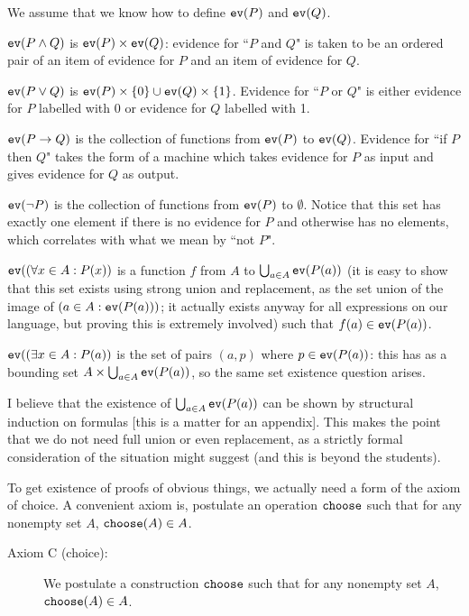 \documentclass[12pt]{article}
\begin{document}
\begin{description}
We assume that we know how to define ${\tt ev}(P)$ and ${\tt ev}(Q)$.

${\tt ev}(P \wedge Q)$ is ${\tt ev}(P) \times {\tt ev}(Q)$:  evidence for ``$P$ and $Q$" is taken to be an ordered pair of an item of evidence for $P$ and an item of evidence for $Q$.

${\tt ev}(P \vee Q)$ is ${\tt ev}(P) \times \{0\} \cup {\tt ev}(Q) \times \{1\}$.  Evidence for ``$P$ or $Q$"
is either evidence for $P$ labelled with 0 or evidence for $Q$ labelled with 1.

${\tt ev}(P \rightarrow Q)$ is the collection of functions from ${\tt ev}(P)$ to ${\tt ev}(Q)$.  Evidence for  ``if $P$ then $Q$" takes the form of a machine which takes evidence for $P$ as input and gives evidence for $Q$ as output.

${\tt ev}(\neg P)$ is the collection of functions from ${\tt ev}(P)$ to $\emptyset$.  Notice that this set
has exactly one element if there is no evidence for $P$ and otherwise has no elements, which correlates with what we mean by ``not $P$".

${\tt ev}((\forall x\in A :P(x))$ is a function $f$ from $A$ to $\bigcup_{a \in A}{\tt ev}(P(a))$ (it is easy to show that this set exists using strong union and replacement, as the set union of the image of $(a \in A:{\tt ev}(P(a)))$; it actually exists anyway for all expressions on our language, but proving this is extremely involved) such that $f(a) \in {\tt ev}(P(a))$.

${\tt ev}((\exists x \in A:P(a))$ is the set of pairs $(a,p)$ where $p \in {\tt ev}(P(a))$:  this has as a bounding
set $A \times \bigcup_{a \in A}{\tt ev}(P(a))$, so the same set existence question arises.

I believe that the existence of $\bigcup_{a \in A}{\tt ev}(P(a))$ can be shown by structural induction on formulas [this is a matter for an appendix].  This makes the point that we do not need full union or even replacement, as a strictly formal consideration of the situation might suggest (and this is beyond the students).

To get existence of proofs of obvious things, we actually need a form of the axiom of choice.  A convenient
axiom is, postulate an operation ${\tt choose}$ such that for any nonempty set $A$, ${\tt choose}(A) \in A$.

\begin{description}

\item[Axiom C (choice):]  We postulate a construction ${\tt choose}$ such that for any nonempty set $A$,
${\tt choose}(A) \in A$.


\end{description}
\end{description}
\end{document}
